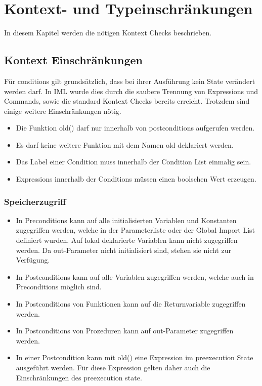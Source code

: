 \section{Kontext- und Typeinschränkungen}
\label{sec:constraints}
In diesem Kapitel werden die nötigen Kontext Checks beschrieben.

\subsection{Kontext Einschränkungen}

Für conditions gilt grundsätzlich, dass bei ihrer Ausführung kein State verändert werden 
darf. In IML wurde dies durch die saubere Trennung von Expressions und Commands, sowie die standard
Kontext Checks bereits erreicht. Trotzdem sind einige weitere Einschränkungen nötig.

\begin{itemize}

\item Die Funktion old() darf nur innerhalb von postconditions aufgerufen werden.
\item Es darf keine weitere Funktion mit dem Namen old deklariert werden.
\item Das Label einer Condition muss innerhalb der Condition List einmalig sein.
\item Expressions innerhalb der Conditions müssen einen boolschen Wert erzeugen.

\end{itemize}

\subsubsection{Speicherzugriff}

\begin{itemize}
\item In Preconditions kann auf alle initialisierten Variablen und Konstanten zugegriffen werden, welche 
in der Parameterliste oder der Global Import List definiert wurden. Auf lokal deklarierte Variablen 
kann nicht zugegriffen werden. Da out-Parameter nicht initialisiert sind, stehen sie nicht zur
Verfügung.
\item In Postconditions kann auf alle Variablen zugegriffen werden, welche auch in 
Preconditions möglich sind. 
\item In Postconditions von Funktionen kann auf die Returnvariable zugegriffen werden.
\item In Postconditions von Prozeduren kann auf out-Parameter zugegriffen werden.
\item In einer Postcondition kann mit old() eine Expression im preexecution State ausgeführt werden. Für diese Expression 
gelten daher auch die Einschränkungen des preexecution state.

\end{itemize}



